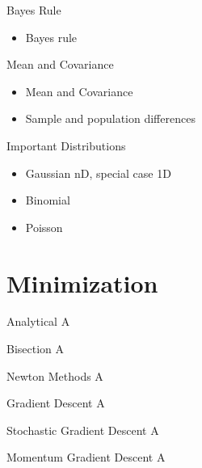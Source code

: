   \begin{frame}{Bayes Rule}
    \begin{itemize}
      \item Bayes rule
    \end{itemize}
  \end{frame}

  \begin{frame}{Mean and Covariance}
    \begin{itemize}
      \item Mean and Covariance
      \item Sample and population differences
    \end{itemize}
  \end{frame}

  \begin{frame}{Important Distributions}
    \begin{itemize}
      \item Gaussian nD, special case 1D
      \item Binomial
      \item Poisson
    \end{itemize}
  \end{frame}


  \section{Minimization}
  \begin{frame}{Analytical}
    A
  \end{frame}

  \begin{frame}{Bisection}
    A
  \end{frame}

  \begin{frame}{Newton Methods}
    A
  \end{frame}

  \begin{frame}{Gradient Descent}
    A
  \end{frame}

  \begin{frame}{Stochastic Gradient Descent}
    A
  \end{frame}

  \begin{frame}{Momentum Gradient Descent}
    A
  \end{frame}
